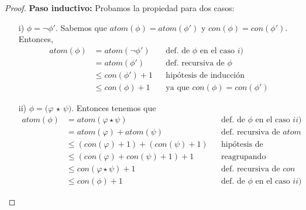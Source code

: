 \documentclass[letterpaper,12pt]{article}
\begin{document}
\begin{enumerate}
\begin{proof}
        \textbf{Paso inductivo:} Probamos la propiedad para dos casos:
        \begin{itemize}
            \item[i)] $\phi = \neg \phi'$. Sabemos que  
            $atom(\phi) = atom(\phi')$ y $con(\phi) = con(\phi')$. Entonces, 
            \begin{align*}
                atom(\phi) &= atom(\neg \phi')
                           && \text{def. de $\phi$ en el caso $i$)} \\
                           &= atom(\phi')
                           && \text{def. recursiva de $\phi$} \\
                           &\leq con(\phi') + 1
                           && \text{hipótesis de inducción} \\
                           &\leq con(\phi) + 1
                           && \text{ya que $con(\phi) = con(\phi')$}
            \end{align*} 

            \item[ii)] $\phi = (\varphi$ $\star$ $\psi)$. Entonces tenemos que 
            \begin{align*}
                atom(\phi) &= atom(\varphi \star \psi) 
                           && \text{def. de $\phi$ en el caso $ii)$} \\ 
                           &= atom(\varphi) + atom(\psi)
                           && \text{def. recursiva de $atom$} \\
                           &\leq (con(\varphi) + 1) + (con(\psi) + 1)
                           && \text{hipótesis de inducción} \\
                           &\leq (con(\varphi) + con(\psi) + 1) + 1
                           && \text{reagrupando} \\
                           &\leq con (\varphi \star \psi) + 1
                           && \text{def. recursiva de $con$} \\
                           &\leq con(\phi) + 1
                           && \text{def. de $\phi$ en el caso $ii)$}
            \end{align*}

        \end{itemize} 
        
    \end{proof}

\end{enumerate}
\end{document}
